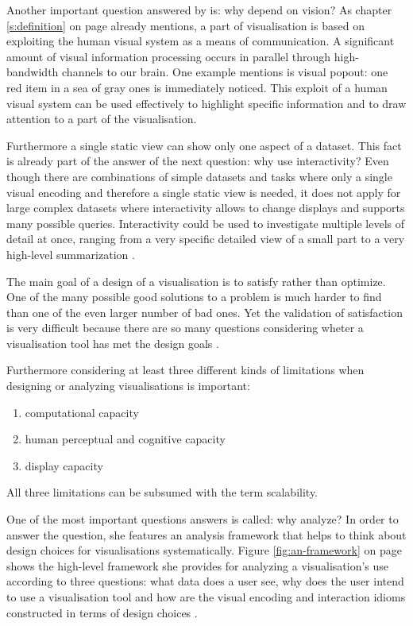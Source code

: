 
Another important question answered by \citeauthor{Munzner2014} is: why depend on vision? As chapter \ref{s:definition} on page \pageref{s:definition} already mentions, a part of visualisation is based on exploiting the human visual system as a means of communication. A significant amount of visual information processing occurs in parallel through high-bandwidth channels to our brain. One example \citeauthor{Munzner2014} mentions is visual popout: one red item in a sea of gray ones is immediately noticed. This exploit of a human visual system can be used effectively to highlight specific information and to draw attention to a part of the visualisation.

Furthermore a single static view can show only one aspect of a dataset. This fact is already part of the answer of the next question: why use interactivity? Even though there are combinations of simple datasets and tasks where only a single visual encoding and therefore a single static view is needed, it does not apply for large complex datasets where interactivity allows to change displays and supports many possible queries. Interactivity could be used to investigate multiple levels of detail at once, ranging from a very specific detailed view of a small part to a very high-level summarization .

The main goal of a design of a visualisation is to satisfy rather than optimize. One of the many possible good solutions to a problem is much harder to find than one of the even larger number of bad ones. Yet the validation of satisfaction is very difficult because there are so many questions considering wheter a visualisation tool has met the design goals .

Furthermore considering at least three different kinds of limitations when designing or analyzing visualisations is important:
\begin{enumerate}
\item computational capacity
\item human perceptual and cognitive capacity
\item display capacity
\end{enumerate}

All three limitations can be subsumed with the term scalability.

One of the most important questions \citeauthor{Munzner2014} answers is called: why analyze? In order to answer the question, she features an analysis framework that helps to think about design choices for visualisations systematically. Figure \ref{fig:an-framework} on page \pageref{fig:an-framework} shows the high-level framework she provides for analyzing a visualisation's use according to three questions: what data does a user see, why does the user intend to use a visualisation tool and how are the visual encoding and interaction idioms constructed in terms of design choices .

